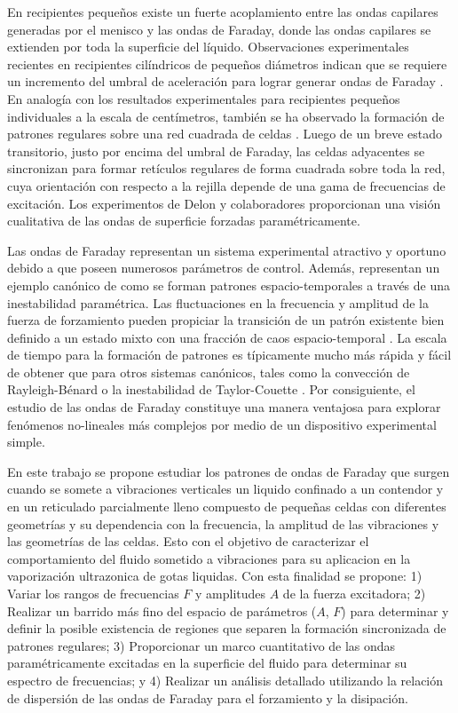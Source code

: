 En recipientes pequeños existe un fuerte acoplamiento entre las ondas capilares generadas por el menisco y las ondas de Faraday, donde las ondas capilares se extienden por toda la superficie del líquido. Observaciones experimentales recientes en recipientes cilíndricos de pequeños diámetros indican que se requiere un incremento del umbral de aceleración para lograr generar ondas de Faraday \cite{nguyem2011effect}. En analogía con los resultados experimentales para recipientes pequeños individuales a la escala de centímetros, también se ha observado la formación de patrones regulares sobre una red cuadrada de celdas \cite{Delon2010b}. Luego de un breve estado transitorio, justo por encima del umbral de Faraday, las celdas adyacentes se sincronizan para formar retículos regulares de forma cuadrada sobre toda la red, cuya orientación con respecto a la rejilla depende de una gama de frecuencias de excitación. Los experimentos de Delon y colaboradores \cite{Delon2010b} proporcionan una visión cualitativa de las ondas de superficie forzadas paramétricamente. \medskip \bigskip

Las ondas de Faraday representan un sistema experimental atractivo y oportuno debido a que poseen numerosos parámetros de control. Además, representan un ejemplo canónico de como se forman patrones espacio-temporales a través de una inestabilidad paramétrica. Las fluctuaciones en la frecuencia y amplitud de la fuerza de forzamiento pueden propiciar la transición de un patrón existente bien definido a un estado mixto con una fracción de caos espacio-temporal \cite{kudrolli1996localized, ciliberto1985chaotic}. La escala de tiempo para la formación de patrones es típicamente mucho más rápida y fácil de obtener que para otros sistemas canónicos, tales como la convección de Rayleigh-Bénard \cite{ behringer1982heat, manneville2006rayleigh} o la inestabilidad de Taylor-Couette \cite{czarny2007time, shaqfeh1992effects}. Por consiguiente, el estudio de las ondas de Faraday constituye una manera ventajosa para explorar fenómenos no-lineales más complejos por medio de un dispositivo experimental simple. \medskip \bigskip

En este trabajo se propone estudiar los patrones de ondas de Faraday que surgen cuando se somete a vibraciones verticales un liquido confinado a un contendor y en un reticulado parcialmente lleno compuesto de pequeñas celdas con diferentes geometrías y su dependencia con la frecuencia, la amplitud de las vibraciones y las geometrías de las celdas. Esto con el objetivo de caracterizar el comportamiento del fluido sometido a vibraciones para su aplicacion en la vaporización ultrazonica de gotas liquidas. Con esta finalidad se propone: 1) Variar los rangos de frecuencias $F$ y amplitudes $A$ de la fuerza excitadora; 2) Realizar un barrido más fino del espacio de parámetros ($A$, $F$) para determinar y definir la posible existencia de regiones que separen la formación sincronizada de patrones regulares; 3) Proporcionar un marco cuantitativo de las ondas paramétricamente excitadas en la superficie del fluido para determinar su espectro de frecuencias; y 4) Realizar un análisis detallado utilizando la relación de dispersión de las ondas de Faraday para el forzamiento y la disipación. \medskip \bigskip


